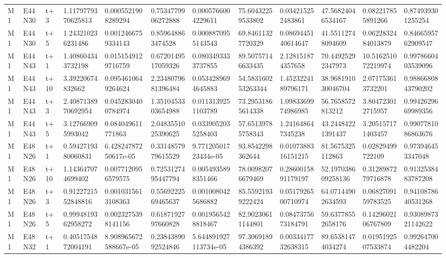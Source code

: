 \begin{landscape}
\begin{longtable}{llllllllllll}
M1 & E44N30 & t+3 & 1.1179779370625813 & 0.0005521908289294 & 0.7534779906272888 & 0.0005766004229611 & 75.60432259533802 & 0.034215252483861 & 47.56824046534167 & 0.082217855891266 & 0.874939301255254 \\
M1 & E44N30 & t+5 & 1.243210236231486 & 0.0012466759334143 & 0.859648863474528 & 0.0008870955143543 & 69.84611327720329 & 0.0869445140614647 & 41.55112748094609 & 0.0622832484013879 & 0.8466595762909547 \\
M1 & E44N43 & t+1 & 1.408604343732198 & 0.0151549129716759 & 0.6720149517059326 & 0.0803493333737855 & 89.50757146633435 & 2.128151874357658 & 70.44925292347973 & 10.516251072219974 & 0.9978660403539096 \\
M1 & E44N43 & t+10 & 3.39220674832662 & 0.0954610649264624 & 2.2348079681396484 & 0.0534289694645883 & 54.583160253263344 & 1.4523224189796171 & 38.968191030046704 & 2.071753613732201 & 0.9886680843790202 \\
M1 & E44N43 & t+3 & 2.4087138970692954 & 0.0452830400784974 & 1.3510453303654988 & 0.0113139251103789 & 73.29531865614338 & 1.0983369974986985 & 56.7658572813212 & 3.804723012715957 & 0.9942629669989356 \\
M1 & E44N43 & t+5 & 3.127669095993042 & 0.084049611771863 & 2.0483551025390625 & 0.0339052035258403 & 57.65139785758343 & 1.241648647345238 & 43.24484221391437 & 3.205157171403457 & 0.9907781086863676 \\
M1 & E48N26 & t+1 & 0.5942719380060831 & 6.42824787250617e-05 & 0.3314857979615529 & 9.77120501723434e-05 & 93.8542298362644 & 0.0107388316151215 & 81.5675325112863 & 0.02829499722109 & 0.973946453347048 \\
M1 & E48N26 & t+10 & 1.143647074699402 & 0.0077120956579575 & 0.7253127495447794 & 0.0054935898351466 & 78.00982076679469 & 0.2860015891179197 & 52.197038609258136 & 0.3128987279716878 & 0.9132538483787208 \\
M1 & E48N26 & t+3 & 0.9122721552848816 & 0.0010315613108363 & 0.5569222569465637 & 0.0010080425686882 & 85.55921939222424 & 0.0517926500710974 & 64.07144902634593 & 0.0682709159783525 & 0.9410878640531268 \\
M1 & E48N26 & t+5 & 0.9994819362958272 & 0.0023275398141156 & 0.6187192797660828 & 0.0019565428818467 & 82.90230611144801 & 0.0847375673184791 & 59.63778552658176 & 0.1429602106767809 & 0.9308987321142622 \\
M1 & E48N32 & t+1 & 0.4051754872004191 & 8.908965672588667e-05 & 0.2384389092524846 & 5.644891927113734e-05 & 97.30691894386392 & 0.0033417732638315 & 89.65381474034274 & 0.0195192507533874 & 0.992647004482204 \\

\end{longtable}
\end{landscape}
